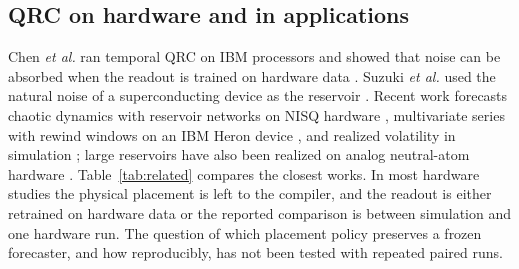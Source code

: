 \documentclass[journal]{IEEEtran}
\begin{document}
\subsection{QRC on hardware and in applications}
Chen \emph{et al.} ran temporal QRC on IBM processors and showed that noise can be absorbed when the readout is trained on hardware data \cite{Chen2020Noisy}. Suzuki \emph{et al.} used the natural noise of a superconducting device as the reservoir \cite{Suzuki2022Natural}. Recent work forecasts chaotic dynamics with reservoir networks on NISQ hardware \cite{Connerty2026Hardware}, multivariate series with rewind windows on an IBM Heron device \cite{Hamhoum2025Multivariate}, and realized volatility in simulation \cite{Li2026Volatility}; large reservoirs have also been realized on analog neutral-atom hardware \cite{Kornjaca2024Analog}. Table~\ref{tab:related} compares the closest works. In most hardware studies the physical placement is left to the compiler, and the readout is either retrained on hardware data or the reported comparison is between simulation and one hardware run. The question of which placement policy preserves a frozen forecaster, and how reproducibly, has not been tested with repeated paired runs.
\end{document}
